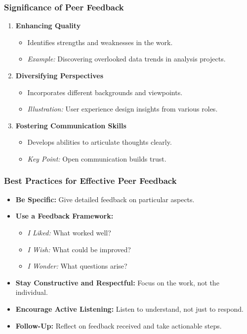 \documentclass[aspectratio=169]{beamer}
\begin{document}
\begin{frame}[fragile]
    \frametitle{Significance of Peer Feedback}
    \begin{enumerate}
        \item \textbf{Enhancing Quality}
            \begin{itemize}
                \item Identifies strengths and weaknesses in the work.
                \item \textit{Example:} Discovering overlooked data trends in analysis projects.
            \end{itemize}
        \item \textbf{Diversifying Perspectives}
            \begin{itemize}
                \item Incorporates different backgrounds and viewpoints.
                \item \textit{Illustration:} User experience design insights from various roles.
            \end{itemize}
        \item \textbf{Fostering Communication Skills}
            \begin{itemize}
                \item Develops abilities to articulate thoughts clearly.
                \item \textit{Key Point:} Open communication builds trust.
            \end{itemize}
    \end{enumerate}
\end{frame}

\begin{frame}[fragile]
    \frametitle{Best Practices for Effective Peer Feedback}
    \begin{itemize}
        \item \textbf{Be Specific:} Give detailed feedback on particular aspects.
        \item \textbf{Use a Feedback Framework:}
            \begin{itemize}
                \item \textit{I Liked:} What worked well?
                \item \textit{I Wish:} What could be improved?
                \item \textit{I Wonder:} What questions arise?
            \end{itemize}
        \item \textbf{Stay Constructive and Respectful:} Focus on the work, not the individual.
        \item \textbf{Encourage Active Listening:} Listen to understand, not just to respond.
        \item \textbf{Follow-Up:} Reflect on feedback received and take actionable steps.
    \end{itemize}
\end{frame}
\end{document}
